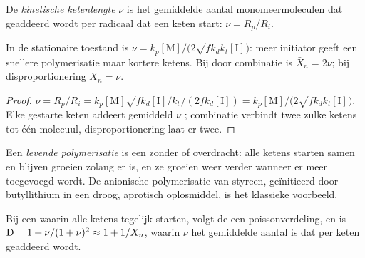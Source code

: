 \begin{definition}\label{def:b2:polymer-synthesis:chain-length}
De \emph{kinetische ketenlengte} $\nu$ is het gemiddelde aantal
monomeermoleculen dat geaddeerd wordt per radicaal dat een keten start: $\nu = R_p/R_i$.
\end{definition}

\begin{proposition}\label{prop:b2:polymer-synthesis:chain-length}
In de stationaire toestand is $\nu = k_p[\mathrm M]/\bigl(2\sqrt{fk_dk_t[\mathrm I]}\bigr)$: meer initiator geeft
een snellere polymerisatie maar kortere ketens. Bij  door combinatie is $\bar X_n = 2\nu$; bij
disproportionering $\bar X_n = \nu$.
\end{proposition}

\begin{proof}
$\nu = R_p/R_i = k_p[\mathrm M]\sqrt{fk_d[\mathrm I]/k_t}/(2fk_d[\mathrm I]) =
k_p[\mathrm M]/\bigl(2\sqrt{fk_dk_t[\mathrm I]}\bigr)$. Elke gestarte keten addeert gemiddeld $\nu$ ;
combinatie verbindt twee zulke ketens tot één molecuul, disproportionering laat er twee.
\end{proof}

\begin{definition}\label{def:b2:polymer-synthesis:living}
Een \emph{levende polymerisatie} is een  zonder
 of overdracht: alle ketens starten samen en blijven groeien zolang er  is, en
ze groeien weer verder wanneer er meer  toegevoegd wordt. De anionische polymerisatie van styreen, geïnitieerd door
butyllithium in een droog, aprotisch oplosmiddel, is het klassieke voorbeeld.
\end{definition}

\begin{proposition}\label{prop:b2:polymer-synthesis:living}
Bij een  waarin alle ketens tegelijk starten, volgt de  een
poissonverdeling, en is $\text{\DH} = 1 + \nu/(1+\nu)^2 \approx 1 + 1/\bar X_n$, waarin $\nu$ het
gemiddelde aantal  is dat per keten geaddeerd wordt.
\end{proposition}

